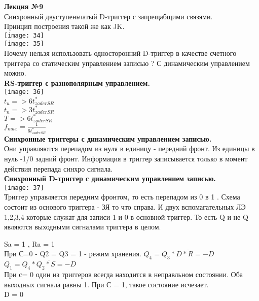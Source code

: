 \LARGE{ \textbf {Лекция №9}}\\

Синхронный двуступеньчатый D-триггер с запрещабщими связями.\\

Принцип построения такой же как JK.\\
\texttt{[image: 34]}\\
\texttt{[image: 35]}\\
Почему нельзя использовать односторонний D-триггер в качестве счетного триггера со статическим управлением записью ? С динамическим управлением можно.\\

\textbf{RS-триггер с разнополярным управлением.}\\
\texttt{[image: 36]}\\
$t_{u} => 6t^*_{zaderSR}$\\
$t_{n} => 3t^*_{zaderSR}$\\
$T => 6t^*_{zaderSR} $\\
$f_{max} = \frac{1}{6 t^*_{zaderSR}} $\\



\textbf{Синхронные триггеры с динамическим управлением записью.}\\
Они управляются перепадом из нуля в единицу - передний фронт. Из единицы в нуль -1/0 задний фронт.
Информация в триггер записывается только в момент действия перепада синхро сигнала.\\

\textbf{Синхронный D-триггер с динамическим управлением записью.}\\
\texttt{[image: 37]}\\

Триггер управляется передним фронтом, то есть перепадом из 0 в 1 .
Схема состоит из основого триггера - ЗЯ то что справа.
И двух вспомагательных ЛЭ 1,2,3,4 которые служат для записи 1 и 0 в основной триггер.
То есть Q и не Q являются  выходными сигналами триггера в целом.

Sa = 1 , Ra = 1\\
При С=0 - Q2 = Q3 = 1 - режим хранения.
$Q_4 = \overline {Q_3 * D *R = -D }  $ \\
$Q_1 = \overline{ Q_4 * Q_2 *S = -D }  $ \\
При с= 0 один из триггеров всегда находится в неправльном состоянии. Оба выходных сигнала равны 1.
При С = 1, такое состояние исчезает.\\
D =  0

